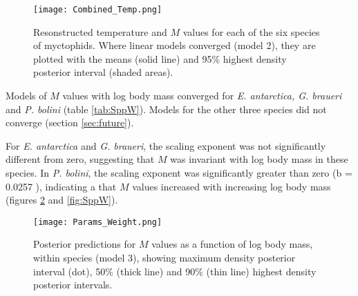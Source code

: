 \documentclass[12pt, titlepage]{article}
\begin{document}
\begin{figure}[H]
\texttt{[image: Combined\_Temp.png]}
\caption{Resonstructed temperature and $M$ values for each of the six species of myctophids. Where linear models converged (model 2), they are plotted with the means (solid line) and 95\% highest density posterior interval (shaded areas).}
\label{fig:SppT}
\end{figure}

Models of $M$ values with log body mass converged for \textit{E. antarctica, G. braueri} and \textit{P. bolini} (table \ref{tab:SppW}).
Models for the other three species did not converge (section \ref{sec:future}).

For \textit{E. antarctica} and \textit{G. braueri}, the scaling exponent was not significantly different from zero, suggesting that $M$ was invariant with log body mass in these species.
In \textit{P. bolini}, the scaling exponent was significantly greater than zero (b = 0.0257 ), indicating a that $M$ values increased with increasing log body mass (figures \ref{fig:ParamsW} and \ref{fig:SppW}).

\begin{figure}[H]
\texttt{[image: Params\_Weight.png]}
\caption{Posterior predictions for $M$ values as a function of log body mass, within species (model 3), showing maximum density posterior interval (dot), 50\% (thick line) and 90\% (thin line) highest density posterior intervals.}
\label{fig:ParamsW}
\end{figure}
\end{document}
